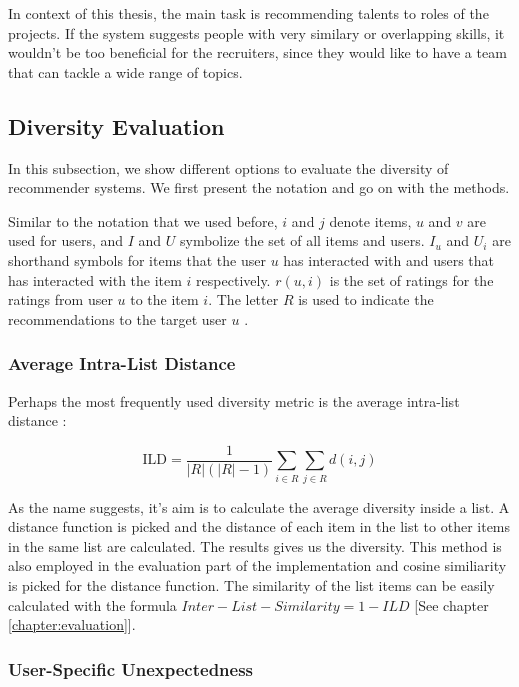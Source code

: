 In context of this thesis, the main task is recommending talents to roles of the projects. If the system suggests people with very similary or overlapping skills, it wouldn't be too beneficial for the recruiters, since they would like to have a team that can tackle a wide range of topics.

\subsection{Diversity Evaluation}

In this subsection, we show different options to evaluate the diversity of recommender systems. We first present the notation and go on with the methods.

Similar to the notation that we used before, $i$ and $j$ denote items, $u$ and $v$ are used for users, and $I$ and $U$ symbolize the set of all items and users. $I_u$ and $U_i$ are shorthand symbols for items that the user $u$ has interacted with and users that has interacted with the item $i$ respectively. $r ( u , i )$ is the set of ratings for the ratings from user $u$ to the item $i$. The letter $R$ is used to indicate the recommendations to the target user $u$ \cite{castells2015novelty}.

\subsubsection{Average Intra-List Distance}

Perhaps the most frequently used diversity metric is the average intra-list distance \cite{castells2015novelty}: 

$$\mathrm { ILD } = \frac { 1 } { | R | ( | R | - 1 ) } \sum _ { i \in R } \sum _ { j \in R } d ( i , j )$$


As the name suggests, it's aim is to calculate the average diversity inside a list. A distance function is picked and the distance of each item in the list to other items in the same list are calculated. The results gives us the diversity. This method is also employed in the evaluation part of the implementation and cosine similiarity is picked for the distance function. The similarity of the list items can be easily calculated with the formula $Inter-List-Similarity = 1 - ILD$ [See chapter \ref{chapter:evaluation}].


\subsubsection{User-Specific Unexpectedness}

